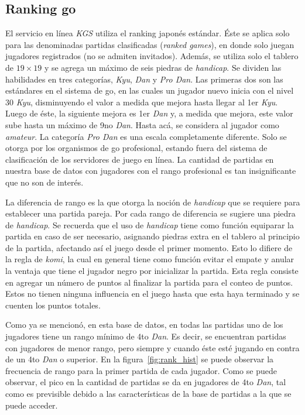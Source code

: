 \documentclass[11pt,twoside, spanish]{report} %
\begin{document}
\subsection{Ranking go}

El servicio en l\'inea \textit{KGS} utiliza el ranking japon\'es est\'andar.
\'Este se aplica solo para las denominadas partidas clasificadas (\emph{ranked games}), en donde solo juegan jugadores registrados (no se admiten invitados).
Adem\'as, se utiliza solo el tablero de $19\times19$ y se agrega un m\'aximo de seis piedras de \textit{handicap}.
Se dividen las habilidades en tres categor\'ias, \textit{Kyu}, \textit{Dan} y \textit{Pro Dan}.
Las primeras dos son las est\'andares en el sistema de go, en las cuales un jugador nuevo inicia con el nivel $30$ \textit{Kyu}, disminuyendo el valor a medida que mejora hasta llegar al 1er \textit{Kyu}.
Luego de \'este, la siguiente mejora es 1er \textit{Dan} y, a medida que mejora, este valor sube hasta un m\'aximo de 9no \textit{Dan}.
Hasta ac\'a, se considera al jugador como \textit{amateur}.
La categor\'ia \textit{Pro Dan} es una escala completamente diferente.
Solo se otorga por los organismos de go profesional, estando fuera del sistema de clasificaci\'on de los servidores de juego en l\'inea.
La cantidad de partidas en nuestra base de datos con jugadores con el rango profesional es tan insignificante que no son de inter\'es.


La diferencia de rango es la que otorga la noci\'on de \textit{handicap} que se requiere para establecer una partida pareja.
Por cada rango de diferencia se sugiere una piedra de \textit{handicap}.
Se recuerda que el uso de \textit{handicap} tiene como funci\'on equiparar la partida en caso de ser necesario, asignando piedras extra en el tablero al principio de la partida, afectando as\'i el juego desde el primer momento.
Esto lo difiere de la regla de \textit{komi}, la cual en general tiene como funci\'on evitar el empate y anular la ventaja que tiene el jugador negro por inicializar la partida.
Esta regla consiste en agregar un n\'umero de puntos al finalizar la partida para el conteo de puntos.
Estos no tienen ninguna influencia en el juego hasta que esta haya terminado y se cuenten los puntos totales.

Como ya se mencion\'o, en esta base de datos, en todas las partidas uno de los jugadores tiene un rango m\'inimo de 4to \textit{Dan}.
Es decir, se encuentran partidas con jugadores de menor rango, pero siempre y cuando \'este est\'e jugando en contra de un 4to \textit{Dan} o superior.
En la figura~\ref{fig:rank_hist} se puede observar la frecuencia de rango para la primer partida de cada jugador.
Como se puede observar, el pico en la cantidad de partidas se da en jugadores de 4to \textit{Dan}, tal como es previsible debido a las caracter\'isticas de la base de partidas a la que se puede acceder.
\end{document}
